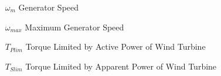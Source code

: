 
\begin{theglossary}{}
	
	\begin{itemize}[leftmargin=4.5em,align=parleft,labelsep=1cm]
		
		
		\item[$\omega_{m}$] 	Generator Speed
		\item[$\omega_{max}$] 	Maximum Generator Speed
		\item[$T_{Plim}$]		Torque Limited by Active Power of Wind Turbine
		\item[$T_{Slim}$] 		Torque Limited by Apparent Power of Wind Turbine
		
	\end{itemize}
	
\end{theglossary}